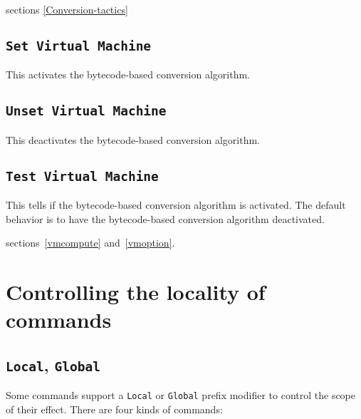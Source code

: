 \SeeAlso sections \ref{Conversion-tactics}

\subsection{\tt Set Virtual Machine
\label{SetVirtualMachine}
}

This activates the bytecode-based conversion algorithm.

\subsection{\tt Unset Virtual Machine
}

This deactivates the bytecode-based conversion algorithm.

\subsection{\tt Test Virtual Machine
}

This tells if the bytecode-based conversion algorithm is
activated. The default behavior is to have the bytecode-based
conversion algorithm deactivated.

\SeeAlso sections~\ref{vmcompute} and~\ref{vmoption}.

\section{Controlling the locality of commands}

\subsection{{\tt Local}, {\tt Global}
}

Some commands support a {\tt Local} or {\tt Global} prefix modifier to
control the scope of their effect. There are four kinds of commands:

